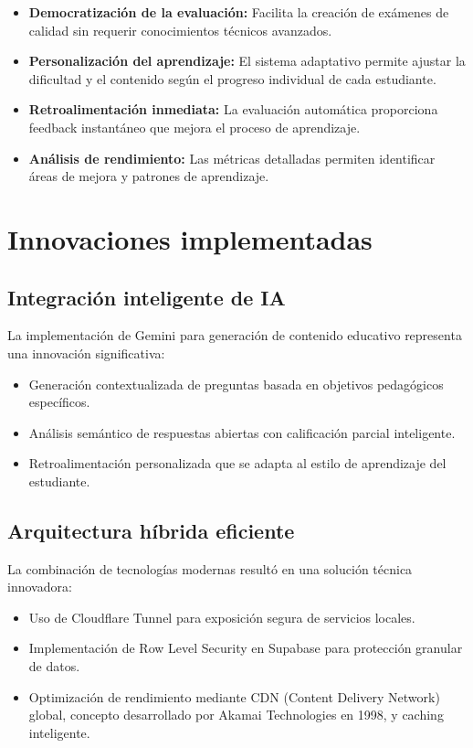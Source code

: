 \documentclass[12pt,a4paper]{report}
\begin{document}
\begin{itemize}
\item \textbf{Democratización de la evaluación:} Facilita la creación de exámenes de calidad sin requerir conocimientos técnicos avanzados.

\item \textbf{Personalización del aprendizaje:} El sistema adaptativo permite ajustar la dificultad y el contenido según el progreso individual de cada estudiante.

\item \textbf{Retroalimentación inmediata:} La evaluación automática proporciona feedback instantáneo que mejora el proceso de aprendizaje.

\item \textbf{Análisis de rendimiento:} Las métricas detalladas permiten identificar áreas de mejora y patrones de aprendizaje.
\end{itemize}

\section{Innovaciones implementadas}

\subsection{Integración inteligente de IA}

La implementación de Gemini para generación de contenido educativo representa una innovación significativa:

\begin{itemize}
\item Generación contextualizada de preguntas basada en objetivos pedagógicos específicos.
\item Análisis semántico de respuestas abiertas con calificación parcial inteligente.
\item Retroalimentación personalizada que se adapta al estilo de aprendizaje del estudiante.
\end{itemize}

\subsection{Arquitectura híbrida eficiente}

La combinación de tecnologías modernas resultó en una solución técnica innovadora:

\begin{itemize}
\item Uso de Cloudflare Tunnel para exposición segura de servicios locales.
\item Implementación de Row Level Security en Supabase para protección granular de datos.
\item Optimización de rendimiento mediante CDN (Content Delivery Network) global, concepto desarrollado por Akamai Technologies en 1998, y caching inteligente.
\end{itemize}
\end{document}
